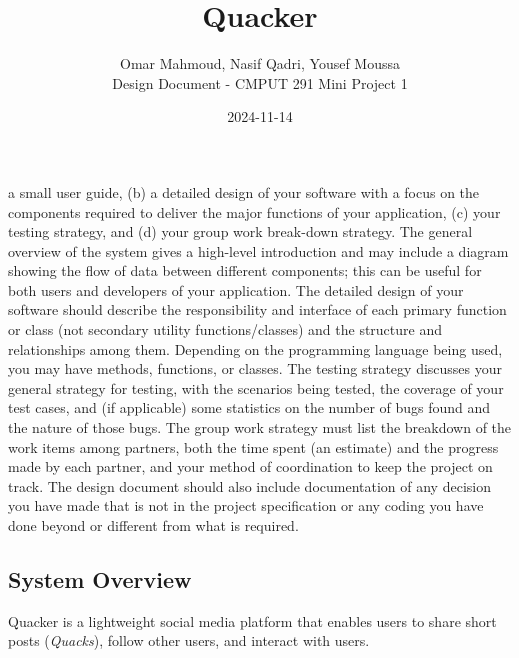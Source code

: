 \documentclass[11pt]{article}
\begin{document}
\title{\huge Quacker} \author{Omar Mahmoud, Nasif Qadri, Yousef Moussa\\[0.5cm]
Design Document - CMPUT 291 Mini Project 1\\} \date{2024-11-14}

\maketitle %

a small user guide, (b) a detailed design of your software with a focus on the
components required to deliver the major functions of your application, (c) your
testing strategy, and (d) your group work break-down strategy. The general
overview of the system gives a high-level introduction and may include a diagram
showing the flow of data between different components; this can be useful for
both users and developers of your application. The detailed design of your
software should describe the responsibility and interface of each primary
function or class (not secondary utility functions/classes) and the structure
and relationships among them. Depending on the programming language being used,
you may have methods, functions, or classes. The testing strategy discusses your
general strategy for testing, with the scenarios being tested, the coverage of
your test cases, and (if applicable) some statistics on the number of bugs found
and the nature of those bugs. The group work strategy must list the breakdown of
the work items among partners, both the time spent (an estimate) and the
progress made by each partner, and your method of coordination to keep the
project on track. The design document should also include documentation of any
decision you have made that is not in the project specification or any coding
you have done beyond or different from what is required.


\subsection{System Overview} Quacker is a lightweight social media platform
that enables users to share short posts (\textit{Quacks}), follow other users,
and interact with users.
\end{document}
